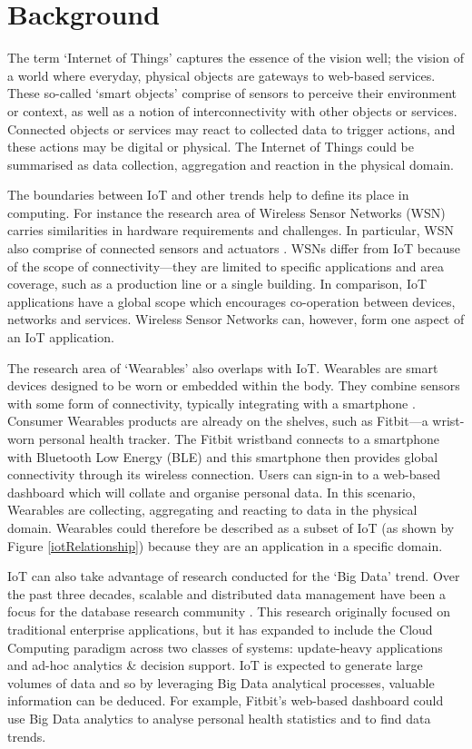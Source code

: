 \chapter{Background}
\label{Chapter:Background}
  The term `Internet of Things' captures the essence of the vision well; the vision of a world where everyday, physical objects are gateways to web-based services. These so-called `smart objects' comprise of sensors to perceive their environment or context, as well as a notion of interconnectivity with other objects or services. Connected objects or services may react to collected data to trigger actions, and these actions may be digital or physical. The Internet of Things could be summarised as data collection, aggregation and reaction in the physical domain.

  The boundaries between IoT and other trends help to define its place in computing. For instance the research area of Wireless Sensor Networks (WSN) carries similarities in hardware requirements and challenges. In particular, WSN also comprise of connected sensors and actuators \citep{Mottola:2011}. WSNs differ from IoT because of the scope of connectivity---they are limited to specific applications and area coverage, such as a production line or a single building. In comparison, IoT applications have a global scope which encourages co-operation between devices, networks and services. Wireless Sensor Networks can, however, form one aspect of an IoT application.

  The research area of `Wearables' also overlaps with IoT. Wearables are smart devices designed to be worn or embedded within the body. They combine sensors with some form of connectivity, typically integrating with a smartphone \citep{6844949}. Consumer Wearables products are already on the shelves, such as Fitbit---a wrist-worn personal health tracker. The Fitbit wristband connects to a smartphone with Bluetooth Low Energy (BLE) and this smartphone then provides global connectivity through its wireless connection. Users can sign-in to a web-based dashboard which will collate and organise personal data. In this scenario, Wearables are collecting, aggregating and reacting to data in the physical domain. Wearables could therefore be described as a subset of IoT (as shown by Figure \ref{iotRelationship}) because they are an application in a specific domain.

  IoT can also take advantage of research conducted for the `Big Data' trend. Over the past three decades, scalable and distributed data management have been a focus for the database research community \citep{Agrawal}. This research originally focused on traditional enterprise applications, but it has expanded to include the Cloud Computing paradigm across two classes of systems: update-heavy applications and ad-hoc analytics \& decision support. IoT is expected to generate large volumes of data and so by leveraging Big Data analytical processes, valuable information can be deduced. For example, Fitbit's web-based dashboard could use Big Data analytics to analyse personal health statistics and to find data trends. 

